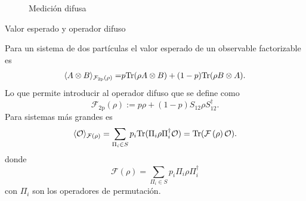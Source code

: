 \documentclass[svgnames,12pt,aspectratio=149]{beamer}
\newcommand{\ra}{\rangle}
\newcommand{\la}{\langle}
\newcommand{\tr}{{\rm Tr}}
\newcommand{\tensor}{\otimes}
\newcommand{\fuzzy}[1]{\mathcal{F}\left(#1\right)}
\newcommand{\permut}[2]{\Pi_{#1}#2\Pi_{#1}^{\dagger}}
\begin{document}
\begin{frame}   \begin{figure}[H]
\centering
{}

\caption{Medición difusa}\label{fig:lego}
\end{figure} 

    
\end{frame}

\begin{frame}{Valor esperado y operador difuso}

 
Para un sistema de dos partículas el valor esperado de un observable factorizable es 
\begin{equation*}\label{eq:Expected-Value-FM-2p}
    \begin{split}
      \la {A\otimes B}\ra_{\mathcal{F}_{2\text{p}}(\rho)} =&p\tr(\rho A\tensor B)+(1-p)\tr(\rho B\otimes A).\\
    \end{split}
\end{equation*}Lo que permite introducir al operador difuso que se define como \begin{equation*}\label{eq:op_F2p}
    \mathcal{F}_{2\text{p}}(\rho):=p\rho + (1-p)S_{12}\rho S_{12}^{\dagger}.
\end{equation*}
Para sistemas más grandes es 
\begin{equation*}\label{eq:expected-value-fm-general}
    \la \mathcal{O}\ra_{\fuzzy{\rho}}=\sum_{\Pi_i\in S}p_i\tr(\permut{i}{\rho}\mathcal{O}) =\tr(\fuzzy{\rho}\mathcal{O}).
\end{equation*} donde \begin{equation*}\label{eq:fuzzy-op-nparticles}
    \fuzzy{\rho}=\sum_{\Pi_i\in S}p_{i}\permut{i}{\rho}
 \end{equation*} con $\Pi_i$ son los operadores de permutación.

\end{frame}
\end{document}
